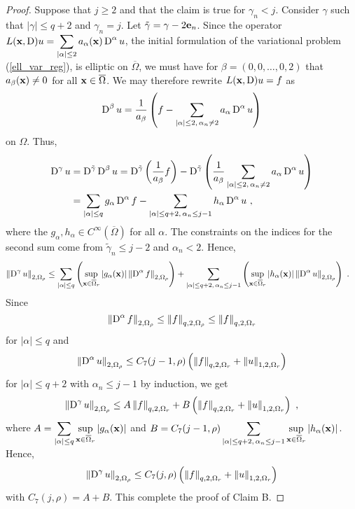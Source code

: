 \begin{proof}
Suppose that $j\geq 2$ and that the claim is true for $\gamma_n<j$.
Consider $\gamma$ such that $|\gamma| \leq q+2$ and $\gamma_n = j$.
Let $\tilde{\gamma} = \gamma - 2 \mathbf{e}_n$.
Since the operator
$\displaystyle
L(\mathbf{x},\operatorname{D})u = \sum_{|\alpha|\leq 2} a_\alpha(\mathbf{x}) \operatorname{D}^\alpha u$,
the initial formulation of the variational problem
(\ref{ell_var_reg}), is elliptic on $\overline{\Omega}$, we must have
for $\beta = (0,0,\ldots,0,2)$ that
$a_{\beta}(\mathbf{x}) \neq 0$ for all $\mathbf{x} \in \overline{\Omega}$.
We may therefore rewrite $L(\mathbf{x},\operatorname{D})u = f$ as
\[
\operatorname{D}^\beta u = \frac{1}{a_\beta} \left( f -
\sum_{|\alpha|\leq 2,\, \alpha_n\neq 2} a_\alpha \operatorname{D}^\alpha u \right)
\]
on $\Omega$.  Thus,
\begin{align*}
\diff^\gamma u &= \diff^{\tilde{\gamma}} \diff^\beta u
= \diff^{\tilde{\gamma}}\left(
\frac{1}{a_\beta} f \right) - \diff^{\tilde{\gamma}} \left( \frac{1}{a_\beta}
\sum_{|\alpha|\leq 2,\, \alpha_n\neq 2} a_\alpha \diff^\alpha u \right) \\
&= \sum_{|\alpha|\leq q} g_\alpha \diff^\alpha f
- \sum_{|\alpha|\leq q+2,\, \alpha_n\leq j-1} h_\alpha \diff^\alpha u \ ,
\end{align*}
where the $\displaystyle g_\alpha, h_\alpha \in C^\infty(\overline{\Omega})$
for all $\alpha$.  The constraints on the indices for the second sum come
from $\tilde{\gamma}_n \leq j-2$ and $\alpha_n <2$.  Hence,
\begin{align*}
\left\| \operatorname{D}^\gamma u \right\|_{2,\Omega_\rho}
&\leq \sum_{|\alpha|\leq q} \left(
\sup_{\mathbf{x}\in \overline{\Omega}_r} \left| g_\alpha(\mathbf{x}) \right|
\left\| \operatorname{D}^\alpha f \right\|_{2,\Omega_\rho}\right)
+ \sum_{|\alpha|\leq q+2,\, \alpha_n\leq j-1} \left(
\sup_{\mathbf{x}\in \overline{\Omega}_r} \left| h_\alpha(\mathbf{x}) \right|
\left\| \operatorname{D}^\alpha u \right\|_{2,\Omega_\rho} \right) \ .
\end{align*}
Since
\[
\left\| \operatorname{D}^\alpha f \right\|_{2,\Omega_\rho} \leq
\left\| f \right\|_{q,2,\Omega_\rho} \leq
\left\| f \right\|_{q,2,\Omega_r}
\]
for $|\alpha|\leq q$ and
\[
\left\| \operatorname{D}^\alpha u \right\|_{2,\Omega_\rho} \leq
C_7(j-1,\rho) \left(
\left\|f\right\|_{q,2,\Omega_r} + \left\|u\right\|_{1,2,\Omega_r} \right)
\]
for $|\alpha|\leq q+2$ with $\alpha_n\leq j-1$ by induction, we get
\[
\left\| \operatorname{D}^\gamma u \right\|_{2,\Omega_\rho}
\leq A \left\| f \right\|_{q,2,\Omega_r} +
B \left( \left\|f\right\|_{q,2,\Omega_r} +
\left\|u\right\|_{1,2,\Omega_r} \right) \ ,
\]
where
$\displaystyle A = \sum_{|\alpha|\leq q}
\sup_{\mathbf{x}\in \overline{\Omega}_r} \left| g_\alpha(\mathbf{x}) \right|$
and
$\displaystyle B = C_7(j-1,\rho) \sum_{|\alpha|\leq q+2,\, \alpha_n\leq j-1}
\sup_{\mathbf{x}\in \overline{\Omega}_r} \left| h_\alpha(\mathbf{x}) \right|$.
Hence,
\[
\left\|\operatorname{D}^\gamma u \right\|_{2,\Omega_\rho} \leq C_7(j,\rho) \left(
\left\|f\right\|_{q,2,\Omega_r} + \left\|u\right\|_{1,2,\Omega_r}
\right)
\]
with $C_7(j,\rho) = A+B$.  This complete the proof of Claim B.


\end{proof}
